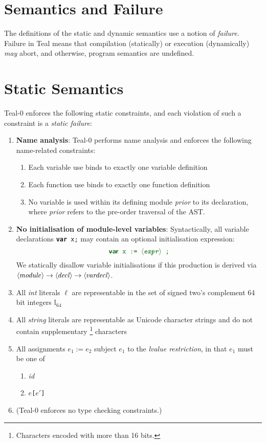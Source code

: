 \documentclass{article}
\newcommand{\ntaX}[1]{\ensuremath{\textit{#1}}}
\newcommand{\tuple}[1]{\ensuremath{\langle #1 \rangle}}
\newcommand{\terminal}[1]{\textit{#1}}
\newcommand{\vterminal}[1]{\textsf{\textcolor{dgreen}{\texttt{#1}}}}
\newcommand{\nt}[1]{\ensuremath{\tuple{\hspace{-0.02cm}\ntaX{#1}\hspace{0.02cm}}}}
\newcommand{\nta}[1]{\nt{#1}}
\newcommand{\Ckw}[1]{{\textsf{\textbf{#1}}}}
\newcommand{\code}[1]{\texttt{\textcolor{dgreen}{#1}}}
\newcommand{\failure}{\textcolor{dred}{failure}}
\begin{document}
\section{Semantics and Failure}
The definitions of the static and dynamic semantics use a notion of
\emph{\failure{}}.  Failure in Teal means that compilation (statically)
or execution (dynamically) \emph{may} abort, and otherwise, program
semantics are undefined.

\section{Static Semantics}

Teal-0 enforces the following static constraints, and each violation of such a constraint is a \emph{static \failure}:
\begin{enumerate}

\item \textbf{Name analysis}: Teal-0 performs name analysis and enforces the following name-related constraints:
  \begin{enumerate}
    \item Each variable use binds to exactly one variable definition
    \item Each function use binds to exactly one function definition
    \item No variable is used within its defining module \emph{prior}
      to its declaration, where \emph{prior} refers to the pre-order
      traversal of the AST.
  \end{enumerate}

\item \textbf{No initialisation of module-level variables}:
  Syntactically, all variable declarations \code{\Ckw{var} x;} may contain an optional initialisation expression:
  \[
  \code{\Ckw{var} x := \nt{expr} ;}
    \]
    We statically disallow variable initialisations if this production
    is derived via
    $\nta{module}\rightarrow\nta{decl}\rightarrow\nta{vardecl}$.
  \item All \terminal{int} literals $\ell$ are representable in the set of signed two's complement 64 bit integers $\mathbb{I}_{64}$
  \item All \terminal{string} literals are representable as Unicode character strings and do not contain supplementary \footnote{Characters encoded with more than 16 bits.} characters
  \item All assignments \vterminal{$e_1 := e_2$} subject $e_1$ to the \emph{lvalue restriction}, in that $e_1$ must be one of
    \begin{enumerate}
      \item \terminal{id}
      \item \vterminal{$e$[$e'$]}
    \end{enumerate}
\item (Teal-0 enforces no type checking constraints.)
\end{enumerate}
\end{document}
